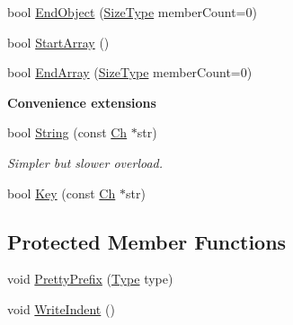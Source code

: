 \begin{Indent}
\begin{DoxyCompactItemize}
\item 
bool \mbox{\hyperlink{classrapidjson_1_1_pretty_writer_ab53444ec4b12be2152bd712c24ec5193}{End\+Object}} (\mbox{\hyperlink{namespacerapidjson_a44eb33eaa523e36d466b1ced64b85c84}{Size\+Type}} member\+Count=0)
\item 
bool \mbox{\hyperlink{classrapidjson_1_1_pretty_writer_ad12f40eaec2b43158cee716dbd88c393}{Start\+Array}} ()
\item 
bool \mbox{\hyperlink{classrapidjson_1_1_pretty_writer_a6c8958810f5cd764de9a8fbe6fb63095}{End\+Array}} (\mbox{\hyperlink{namespacerapidjson_a44eb33eaa523e36d466b1ced64b85c84}{Size\+Type}} member\+Count=0)
\end{DoxyCompactItemize}
\end{Indent}
\begin{Indent}\textbf{ Convenience extensions}\par
\begin{DoxyCompactItemize}
\item 
bool \mbox{\hyperlink{classrapidjson_1_1_pretty_writer_a363c2280393e27e19bceb8d015c2832c}{String}} (const \mbox{\hyperlink{classrapidjson_1_1_pretty_writer_a74a38902073aa599c8bcc6a3ca6126d0}{Ch}} $\ast$str)
\begin{DoxyCompactList}\small\item\em Simpler but slower overload. \end{DoxyCompactList}\item 
bool \mbox{\hyperlink{classrapidjson_1_1_pretty_writer_a0b7000c10be5b1e24920ce27a7ba7f6a}{Key}} (const \mbox{\hyperlink{classrapidjson_1_1_pretty_writer_a74a38902073aa599c8bcc6a3ca6126d0}{Ch}} $\ast$str)
\end{DoxyCompactItemize}
\end{Indent}
\subsection*{Protected Member Functions}
\begin{DoxyCompactItemize}
\item 
void \mbox{\hyperlink{classrapidjson_1_1_pretty_writer_aff11c26086470359ef3ab1142515441c}{Pretty\+Prefix}} (\mbox{\hyperlink{namespacerapidjson_ae79a4751c1c460ff0de5ecc07874f3e4}{Type}} type)
\item 
void \mbox{\hyperlink{classrapidjson_1_1_pretty_writer_aa0bfa813b170d7fc27f1b370388861e4}{Write\+Indent}} ()
\end{DoxyCompactItemize}
